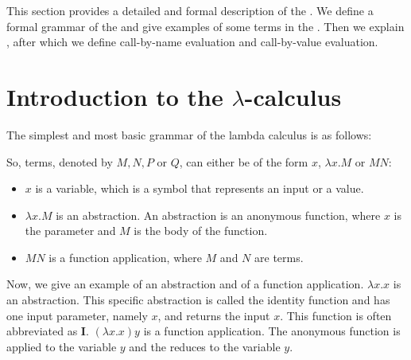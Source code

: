 


This section provides a detailed and formal description of the \lc. We define a formal grammar of the \lc and give examples of some terms in the \lc.
Then we explain \br, after which we define call-by-name evaluation and call-by-value evaluation.


\section{\texorpdfstring{Introduction to the \boldmath$\lambda$-calculus}{Introduction to the Lambda Calculus}}
The simplest and most basic grammar of the lambda calculus is as follows:

\vspace{10pt}
\begin{grammar}{
	}
\end{grammar}

\vspace{10pt}
So, terms, denoted by $M, N, P$ or $Q$, can either be of the form $x$, $\lambda x.M$ or $M N$:
\begin{itemize}[noitemsep]
	\item $x$ is a variable, which is a symbol that represents an input or a value.
	\item $\lambda x.M$ is an abstraction. An abstraction is an anonymous function, where $x$ is the parameter and $M$ is the body of the function.
	\item $M N$ is a function application, where $M$ and $N$ are terms.
\end{itemize}

Now, we give an example of an abstraction and of a function application. $\lambda x. x$ is an abstraction. This specific abstraction is called the identity function and has one input parameter, namely $x$, and returns the input $x$.
This function is often abbreviated as $\mathbf{I}$. $(\lambda x. x) y$ is a function application. The anonymous function is applied to the variable $y$ and the \lterm reduces to the variable $y$.
